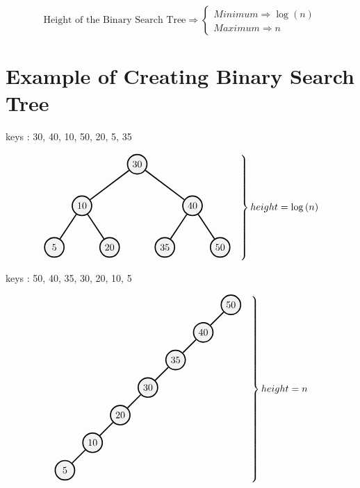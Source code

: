 \documentclass[12pt]{article}
\begin{document}
\begin{tcolorbox}
$$
\text{Height of the Binary Search Tree} \Rightarrow
\begin{cases}
Minimum \Rightarrow \log{(n)} \\
Maximum \Rightarrow n
\end{cases}
$$
\end{tcolorbox}



\section{Example of Creating Binary Search Tree}

keys : 30, 40, 10, 50, 20, 5, 35


\begin{center}
$$
\begin{rcases}
\begin{tikzpicture}[very thick,level/.style={sibling distance=40mm/#1}]
\tikzstyle{vertex}=[draw,fill=black!5,circle,minimum size=20pt,inner sep=1pt]
\node [vertex] (r){$30$}
  child {
	    node [vertex] (a) {$10$}
	    child {
		      node [vertex] {$5$}
	    }
	    child {
		      node [vertex] {$20$}
	    }
  }
  child {
	    node [vertex] {$40$}
	    child {
		      node [vertex] {$35$}
	    }
	    child {
		      node [vertex] {$50$}
	    }
  };
\end{tikzpicture}
&
\end{rcases} 
height = \log{(n)}
$$
\end{center}


\noindent
keys : 50, 40, 35, 30, 20, 10, 5


\begin{center}
$$
\begin{rcases}
\begin{tikzpicture}[very thick,level/.style={sibling distance=20mm,level distance = 10mm}]
\tikzstyle{vertex}=[draw,fill=black!5,circle,minimum size=20pt,inner sep=1pt]
\node [vertex] (r){$50$}
  child {
	    node [vertex] (a) {$40$}
	    child {
		      node [vertex] {$35$}
		       child {
			      node [vertex] {$30$}
			      child {
				      node [vertex] {$20$}
				      child {
					      node [vertex] {$10$}
					      child {
						      node [vertex] {$5$}
					    } child [missing] {}
				    } child [missing] {}
			    } child [missing] {}
		    } child [missing] {}
	    } child [missing] {}
  } child [missing] {};
\end{tikzpicture}
&
\end{rcases} 
height = n
$$
\end{center}
\end{document}
